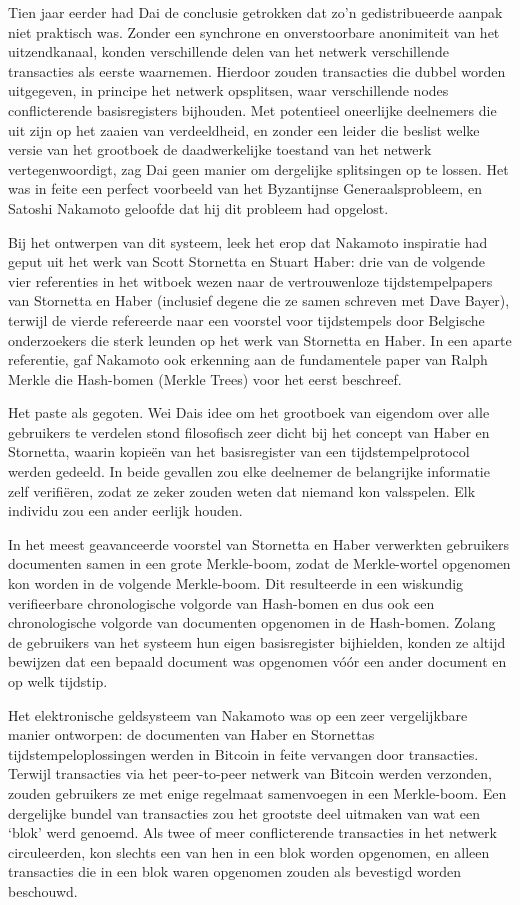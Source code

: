 \documentclass[smalldemyvopaper,11pt,twoside,onecolumn,openright,extrafontsizes,hidelinks]{memoir}
\begin{document}
Tien jaar eerder had Dai de conclusie getrokken dat zo'n gedistribueerde
aanpak niet praktisch was. Zonder een synchrone en onverstoorbare
anonimiteit van het uitzendkanaal, konden verschillende delen van het
netwerk verschillende transacties als eerste waarnemen. Hierdoor zouden
transacties die dubbel worden uitgegeven, in principe het netwerk
opsplitsen, waar verschillende nodes conflicterende basisregisters
bijhouden. Met potentieel oneerlijke deelnemers die uit zijn op het
zaaien van verdeeldheid, en zonder een leider die beslist welke versie
van het grootboek de daadwerkelijke toestand van het netwerk
vertegenwoordigt, zag Dai geen manier om dergelijke splitsingen op te
lossen. Het was in feite een perfect voorbeeld van het Byzantijnse
Generaalsprobleem, en Satoshi Nakamoto geloofde dat hij dit probleem had
opgelost.

Bij het ontwerpen van dit systeem, leek het erop dat Nakamoto inspiratie
had geput uit het werk van Scott Stornetta en Stuart Haber: drie van de
volgende vier referenties in het witboek wezen naar de vertrouwenloze
tijdstempelpapers van Stornetta en Haber (inclusief degene die ze samen
schreven met Dave Bayer), terwijl de vierde refereerde naar een voorstel
voor tijdstempels door Belgische onderzoekers die sterk leunden op het
werk van Stornetta en Haber. In een aparte referentie, gaf Nakamoto ook
erkenning aan de fundamentele paper van Ralph Merkle die Hash-bomen
(Merkle Trees) voor het eerst beschreef.

Het paste als gegoten. Wei Dais idee om het grootboek van eigendom over
alle gebruikers te verdelen stond filosofisch zeer dicht bij het concept
van Haber en Stornetta, waarin kopieën van het basisregister van een
tijdstempelprotocol werden gedeeld. In beide gevallen zou elke deelnemer
de belangrijke informatie zelf verifiëren, zodat ze zeker zouden weten
dat niemand kon valsspelen. Elk individu zou een ander eerlijk houden.

In het meest geavanceerde voorstel van Stornetta en Haber verwerkten
gebruikers documenten samen in een grote Merkle-boom, zodat de
Merkle-wortel opgenomen kon worden in de volgende Merkle-boom. Dit
resulteerde in een wiskundig verifieerbare chronologische volgorde van
Hash-bomen en dus ook een chronologische volgorde van documenten
opgenomen in de Hash-bomen. Zolang de gebruikers van het systeem hun
eigen basisregister bijhielden, konden ze altijd bewijzen dat een
bepaald document was opgenomen vóór een ander document en op welk
tijdstip.

Het elektronische geldsysteem van Nakamoto was op een zeer vergelijkbare
manier ontworpen: de documenten van Haber en Stornettas
tijdstempeloplossingen werden in Bitcoin in feite vervangen door
transacties. Terwijl transacties via het peer-to-peer netwerk van
Bitcoin werden verzonden, zouden gebruikers ze met enige regelmaat
samenvoegen in een Merkle-boom. Een dergelijke bundel van transacties
zou het grootste deel uitmaken van wat een `blok' werd genoemd. Als twee
of meer conflicterende transacties in het netwerk circuleerden, kon
slechts een van hen in een blok worden opgenomen, en alleen transacties
die in een blok waren opgenomen zouden als bevestigd worden beschouwd.
\end{document}
